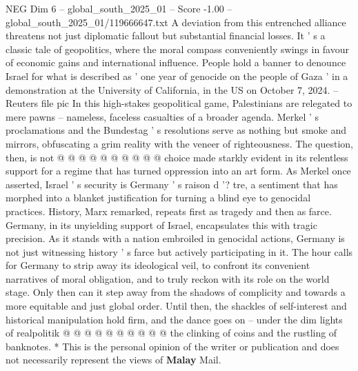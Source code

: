 \begin{textsample}{NEG Dim 6 – global\_south\_2025\_01 – Score -1.00 – global\_south\_2025\_01/119666647.txt}
A deviation from this entrenched alliance threatens not just diplomatic fallout but substantial financial losses.
It ' s a classic tale of geopolitics, where the moral compass conveniently swings in favour of economic gains and international influence.
People hold a banner to denounce Israel for what is described as ' one year of genocide on the people of Gaza ' in a demonstration at the University of California, in the US on October 7, 2024. -- Reuters file pic In this high-stakes geopolitical game, Palestinians are relegated to mere pawns -- nameless, faceless casualties of a broader agenda.
Merkel ' s proclamations and the Bundestag ' s resolutions serve as nothing but smoke and mirrors, obfuscating a grim reality with the veneer of righteousness.
The question, then, is not @ @ @ @ @ @ @ @ @ @ choice made starkly evident in its relentless support for a regime that has turned oppression into an art form.
As Merkel once asserted, Israel ' s security is Germany ' s raison d '? tre, a sentiment that has morphed into a blanket justification for turning a blind eye to genocidal practices.
History, Marx remarked, repeats first as tragedy and then as farce.
Germany, in its unyielding support of Israel, encapsulates this with tragic precision.
As it stands with a nation embroiled in genocidal actions, Germany is not just witnessing history ' s farce but actively participating in it.
The hour calls for Germany to strip away its ideological veil, to confront its convenient narratives of moral obligation, and to truly reckon with its role on the world stage.
Only then can it step away from the shadows of complicity and towards a more equitable and just global order.
Until then, the shackles of self-interest and historical manipulation hold firm, and the dance goes on -- under the dim lights of realpolitik @ @ @ @ @ @ @ @ @ @ the clinking of coins and the rustling of banknotes. * This is the personal opinion of the writer or publication and does not necessarily represent the views of \textbf{Malay} Mail.

\end{textsample}
